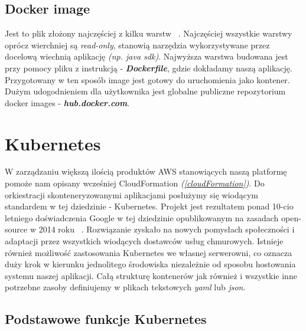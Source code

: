 \subsection{Docker image}
Jest to plik złożony najczęściej z kilku warstw ~\cite{docker-doc}. 
Najczęściej wszystkie warstwy oprócz wierchniej są \emph{read-only}, stanowią narzędzia wykorzystywane przez docelową wiechnią aplikację \emph{(np. java sdk)}.
Najwyższa warstwa budowana jest przy pomocy pliku z instrukcją - \emph{\textbf{Dockerfile}}, gdzie dokładamy naszą aplikację.
Przygotowany w ten sposób image jest gotowy do uruchomienia jako kontener. Dużym udogodnieniem dla użytkownika jest globalne publiczne repozytorium docker images - \emph{\textbf{hub.docker.com}}.


\section{Kubernetes}
W zarządzaniu większą ilością produktów AWS stanowiących naszą platformę pomoże nam opisany wcześniej CloudFormation \emph{(\ref{cloudFormation})}. 
Do orkiestracji skonteneryzowanymi aplikacjami posłużymy się wiodącym standardem w tej dziedzinie - Kubernetes.
Projekt jest rezultatem ponad 10-cio letniego doświadczenia Google w tej dziedzinie opublikowanym na zasadach open-source w 2014 roku ~\cite{k8s-what}.
Rozwiązanie zyskało na nowych pomysłach społeczności i adaptacji przez wszystkich wiodących dostawców usług chmurowych.
Istnieje również możliwość zastosowania Kubernetes we własnej serwerowni, 
co oznacza duży krok w kierunku jednolitego środowiska niezależnie od sposobu hostowania systemu naszej aplikacji.
Całą strukturę kontenerów jak również i wszystkie inne potrzebne zasoby definiujemy w plikach tekstowych {\em yaml} lub {\em json}.

\subsection{Podstawowe funkcje Kubernetes}

